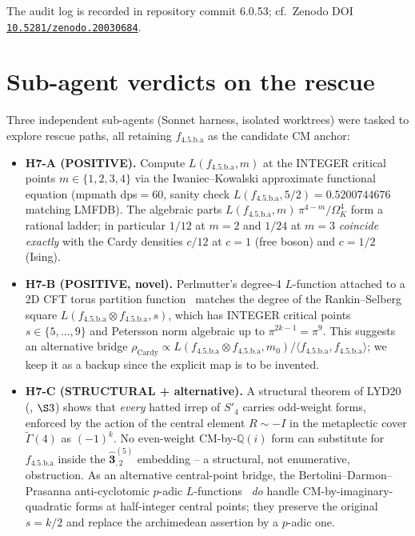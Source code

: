 \documentclass[a4paper,11pt]{article}
\newcommand{\Spf}{S'_4}
\newcommand{\hhat}[1]{\widehat{\mathbf{#1}}}
\newcommand{\OmK}{\Omega_K}
\newcommand{\fLM}{f_{\text{4.5.b.a}}}
\newcommand{\Qi}{\mathbb{Q}(i)}
\newcommand{\Zeno}{\href{https://doi.org/10.5281/zenodo.20030684}{\texttt{10.5281/zenodo.20030684}}}
\theoremstyle{definition}
\theoremstyle{remark}
\begin{document}
\noindent
The audit log is recorded in repository commit 6.0.53; cf.\ Zenodo
DOI \Zeno.

\section{Sub-agent verdicts on the rescue}
\label{sec:rescue}

Three independent sub-agents (Sonnet harness, isolated worktrees) were
tasked to explore rescue paths, all retaining $\fLM$ as the
candidate CM anchor:
\begin{itemize}
  \item \textbf{H7-A (POSITIVE).}  Compute $L(\fLM, m)$ at the
    INTEGER critical points $m\in\{1,2,3,4\}$ via the
    Iwaniec--Kowalski approximate functional equation
    \cite[Thm.~5.3]{IwaKow04} (mpmath dps$=60$, sanity check
    $L(\fLM,5/2)=0.5200744676$ matching LMFDB).  The
    algebraic parts $L(\fLM,m)\,\pi^{4-m}/\OmK^{4}$ form a
    rational ladder; in particular $1/12$ at $m=2$ and $1/24$ at
    $m=3$ \emph{coincide exactly} with the Cardy
    densities $c/12$ at $c=1$ (free boson) and $c=1/2$ (Ising).
  \item \textbf{H7-B (POSITIVE, novel).}  Perlmutter's degree-4
    $L$-function attached to a 2D CFT torus partition
    function~\cite{Perlmutter25} matches the degree of the
    Rankin--Selberg square $L(\fLM \otimes \fLM, s)$, which has
    INTEGER critical points $s\in\{5,\ldots,9\}$ and Petersson norm
    algebraic up to $\pi^{2k-1}=\pi^{9}$.  This suggests an
    alternative bridge $\rho_{\mathrm{Cardy}}\propto
    L(\fLM\otimes\fLM,m_{0})/\langle\fLM,\fLM\rangle$;
    we keep it as a backup since the explicit map is to be invented.
  \item \textbf{H7-C (STRUCTURAL + alternative).}  A structural
    theorem of LYD20 (\cite[Tab.~Level4 MM]{LYD20}, $\S 3$) shows that
    \emph{every} hatted irrep of $\Spf$ carries odd-weight forms,
    enforced by the action of the central element $R\sim -I$ in the
    metaplectic cover $\widetilde{\Gamma}(4)$ as $(-1)^{k}$.  No
    even-weight CM-by-$\Qi$ form can substitute for $\fLM$ inside the
    $\hhat{3}_{,2}^{(5)}$ embedding -- a structural, not enumerative,
    obstruction.  As an alternative central-point bridge, the
    Bertolini--Darmon--Prasanna anti-cyclotomic $p$-adic
    $L$-functions~\cite{BDP13} \emph{do} handle CM-by-imaginary-quadratic
    forms at half-integer central points; they preserve the original
    $s=k/2$ and replace the archimedean assertion by a $p$-adic one.
\end{itemize}
\end{document}
